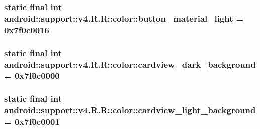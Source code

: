 \hypertarget{classandroid_1_1support_1_1v4_1_1_r_1_1color_8416645127f9d1e35f19ebd5a22d1d7b}{
\subsubsection[{button\_\-material\_\-light}]{\setlength{\rightskip}{0pt plus 5cm}static final int android::support::v4.R.R::color::button\_\-material\_\-light = 0x7f0c0016}}
\label{classandroid_1_1support_1_1v4_1_1_r_1_1color_8416645127f9d1e35f19ebd5a22d1d7b}


\hypertarget{classandroid_1_1support_1_1v4_1_1_r_1_1color_9cf388f5de681b07f81b9b9830779079}{
\subsubsection[{cardview\_\-dark\_\-background}]{\setlength{\rightskip}{0pt plus 5cm}static final int android::support::v4.R.R::color::cardview\_\-dark\_\-background = 0x7f0c0000}}
\label{classandroid_1_1support_1_1v4_1_1_r_1_1color_9cf388f5de681b07f81b9b9830779079}


\hypertarget{classandroid_1_1support_1_1v4_1_1_r_1_1color_3993ddc9ceb51398e6e6a292d0d49b91}{
\subsubsection[{cardview\_\-light\_\-background}]{\setlength{\rightskip}{0pt plus 5cm}static final int android::support::v4.R.R::color::cardview\_\-light\_\-background = 0x7f0c0001}}
\label{classandroid_1_1support_1_1v4_1_1_r_1_1color_3993ddc9ceb51398e6e6a292d0d49b91}


